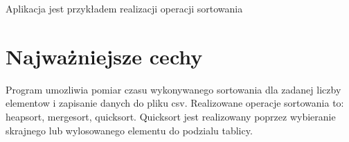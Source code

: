 \-Aplikacja jest przykładem realizacji operacji sortowania\hypertarget{index_etykieta-wazne-cechy}{}\section{\-Najważniejsze cechy}\label{index_etykieta-wazne-cechy}
\-Program umozliwia pomiar czasu wykonywanego sortowania dla zadanej liczby elementow i zapisanie danych do pliku csv. \-Realizowane operacje sortowania to\-: heapsort, mergesort, quicksort. \-Quicksort jest realizowany poprzez wybieranie skrajnego lub wylosowanego elementu do podzialu tablicy. 